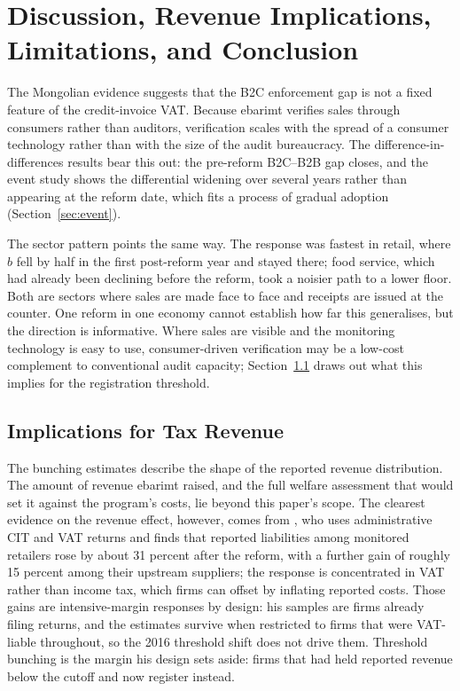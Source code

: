 \documentclass[12pt,oneside,a4paper]{report}
\begin{document}

\chapter{Discussion, Revenue Implications, Limitations, and Conclusion}
\label{ch:discussion}

The Mongolian evidence suggests that the B2C enforcement gap is not a fixed feature of the credit-invoice VAT. Because ebarimt verifies sales through consumers rather than auditors, verification scales with the spread of a consumer technology rather than with the size of the audit bureaucracy. The difference-in-differences results bear this out: the pre-reform B2C--B2B gap closes, and the event study shows the differential widening over several years rather than appearing at the reform date, which fits a process of gradual adoption (Section~\ref{sec:event}).

The sector pattern points the same way. The response was fastest in retail, where $\hat{b}$ fell by half in the first post-reform year and stayed there; food service, which had already been declining before the reform, took a noisier path to a lower floor. Both are sectors where sales are made face to face and receipts are issued at the counter. One reform in one economy cannot establish how far this generalises, but the direction is informative. Where sales are visible and the monitoring technology is easy to use, consumer-driven verification may be a low-cost complement to conventional audit capacity; Section~\ref{sec:revenue} draws out what this implies for the registration threshold.

\section{Implications for Tax Revenue}
\label{sec:revenue}

The bunching estimates describe the shape of the reported revenue distribution. The amount of revenue ebarimt raised, and the full welfare assessment that would set it against the program's costs, lie beyond this paper's scope. The clearest evidence on the revenue effect, however, comes from \textcite{nyamdavaa2023does}, who uses administrative CIT and VAT returns and finds that reported liabilities among monitored retailers rose by about 31 percent after the reform, with a further gain of roughly 15 percent among their upstream suppliers; the response is concentrated in VAT rather than income tax, which firms can offset by inflating reported costs. Those gains are intensive-margin responses by design: his samples are firms already filing returns, and the estimates survive when restricted to firms that were VAT-liable throughout, so the 2016 threshold shift does not drive them. Threshold bunching is the margin his design sets aside: firms that had held reported revenue below the cutoff and now register instead.
\end{document}
